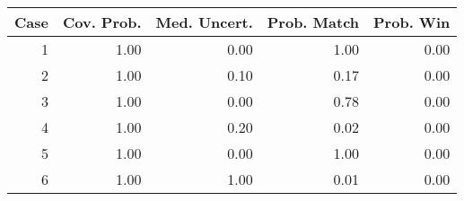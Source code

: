\begin{tabular}{|r|rrrr|}
  \hline
Case & Cov. Prob. & Med. Uncert. & Prob. Match & Prob. Win \\ 
  \hline
1 & 1.00 & 0.00 & 1.00 & 0.00 \\ 
  2 & 1.00 & 0.10 & 0.17 & 0.00 \\ 
  3 & 1.00 & 0.00 & 0.78 & 0.00 \\ 
  4 & 1.00 & 0.20 & 0.02 & 0.00 \\ 
  5 & 1.00 & 0.00 & 1.00 & 0.00 \\ 
  6 & 1.00 & 1.00 & 0.01 & 0.00 \\ 
   \hline
\end{tabular}
